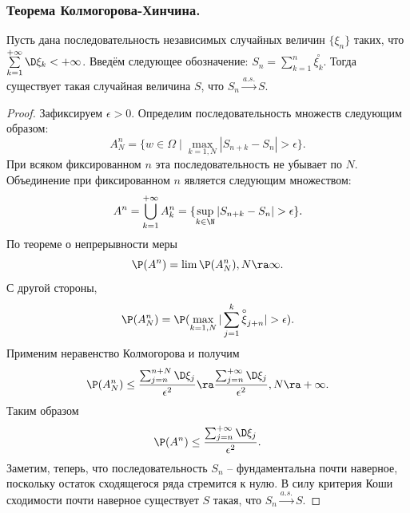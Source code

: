 \subsubsection{Теорема Колмогорова-Хинчина.}
\begin{theorem}
    Пусть дана последовательность независимых случайных величин $\{\xi_n\}$ таких, что $\sum\limits_{k = 1}^{+\infty} \D \xi_k < +\infty$.
    Введём следующее обозначение: $S_n = \sum\limits_{k = 1}^{n} \overset{\circ}{\xi_k}$.
    Тогда существует такая случайная величина $S$, что $S_n \xrightarrow{a.s.} S$.
\end{theorem}
\begin{proof}
    Зафиксируем $\epsilon > 0$.
    Определим последовательность множеств следующим образом:
    \[
        A^n_N = \{w \in \Omega \mid \max\limits_{k = 1, N} |S_{n + k} - S_n| > \epsilon\}.
    \]
    При всяком фиксированном $n$ эта последовательность не убывает по $N$.
    Объединение при фиксированном $n$ является следующим множеством:
    \[
        A^n = \bigcup\limits_{k = 1}^{+\infty} A^n_k = \{\sup\limits_{k \in \N} |S_{n + k} - S_n| > \epsilon\}.
    \]
    По теореме о непрерывности меры
    \[
        \P(A^n) = \lim \P(A^n_N), N \ra \infty.
    \]
    С другой стороны,
    \[
        \P(A^n_N) = \P(\max\limits_{k = 1, N} |\sum\limits_{j = 1}^{k} \overset{\circ}{\xi}_{j + n}| > \epsilon).
    \]
    Применим неравенство Колмогорова и получим
    \[
        \P(A^n_N) \leq \dfrac{\sum_{j = n}^{n + N} \D \xi_j}{\epsilon^2} \ra \dfrac{\sum_{j = n}^{+\infty} \D \xi_j}{\epsilon^2}, N \ra +\infty.
    \]
    Таким образом
    \[
        \P(A^n) \leq \dfrac{\sum_{j = n}^{+\infty} \D\xi_j}{\epsilon^2}.
    \]
    Заметим, теперь, что последовательность $S_n$ -- фундаментальна почти наверное, поскольку остаток сходящегося ряда стремится к нулю.
    В силу критерия Коши сходимости почти наверное существует $S$ такая, что $S_n \xrightarrow{a.s.} S$.
\end{proof}
